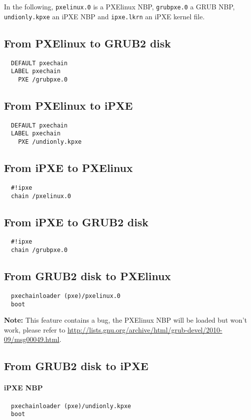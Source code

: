 \documentclass[a4paper,11pt]{article}
\begin{document}
In the following, \texttt{pxelinux.0} is a PXElinux NBP, \texttt{grubpxe.0} a GRUB NBP, \texttt{undionly.kpxe} an iPXE NBP and \texttt{ipxe.lkrn} an iPXE kernel file.

\subsection{From PXElinux to GRUB2 disk}
\begin{verbatim}
  DEFAULT pxechain
  LABEL pxechain
    PXE /grubpxe.0
\end{verbatim}

\subsection{From PXElinux to iPXE}
\begin{verbatim}
  DEFAULT pxechain
  LABEL pxechain
    PXE /undionly.kpxe
\end{verbatim}

\subsection{From iPXE to PXElinux}
\begin{verbatim}
  #!ipxe
  chain /pxelinux.0
\end{verbatim}

\subsection{From iPXE to GRUB2 disk}
\begin{verbatim}
  #!ipxe
  chain /grubpxe.0
\end{verbatim}

\subsection{From GRUB2 disk to PXElinux}
\begin{verbatim}
  pxechainloader (pxe)/pxelinux.0
  boot
\end{verbatim}

\textbf{Note:} This feature contains a bug, the PXElinux NBP will be loaded but won't work, please refer to \url{http://lists.gnu.org/archive/html/grub-devel/2010-09/msg00049.html}.

\subsection{From GRUB2 disk to iPXE}
\paragraph{iPXE NBP}
\begin{verbatim}
  pxechainloader (pxe)/undionly.kpxe
  boot
\end{verbatim}
\end{document}
